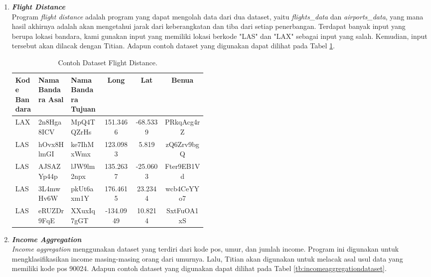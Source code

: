 \begin{enumerate}
      \item \emph{\textbf{Flight Distance}} \\
            Program \emph{flight distance} adalah program yang dapat mengolah data dari dua dataset, yaitu \emph{flights\_data} dan \emph{airports\_data}, yang mana hasil akhirnya adalah akan mengetahui jarak dari keberangkatan dan tiba dari setiap penerbangan. 
            Terdapat banyak input yang berupa lokasi bandara, kami gunakan input yang memiliki lokasi berkode "LAS" dan "LAX" sebagai input yang salah. Kemudian, input tersebut akan dilacak dengan Titian.
            Adapun contoh dataset yang digunakan dapat 
            dilihat pada Tabel \ref{tb:flightdistancedataset}.

            \begin{longtable}{|p{0.12\linewidth}|p{0.17\linewidth}|p{0.17\linewidth}|c|c|c|}
                  \caption{Contoh Dataset Flight Distance.}
                  \label{tb:flightdistancedataset} \\
                  \hline
                  \rowcolor[HTML]{C0C0C0}
                  \raggedright{\textbf{Kode Bandara}} & \raggedright{\textbf{Nama Bandara Asal}} & \raggedright{\textbf{Nama Bandara Tujuan}} & \textbf{Long} & \textbf{Lat} & \textbf{Benua} \\
                  \hline
                  LAX & 2n8Hga8ICV & MpQ4TQZrHs & 151.3466 & -68.5339 & PRkqAcg4rZ \\
                  LAS & hOvx8HlmGI & ke7IhMxWmx & 123.0983 & 5.819 & zQ6Zrv9bgQ \\
                  LAS & AJSAZYp44p & lJW9lm2npx & 135.2637 & -25.0603 & Fter9EB1Vd \\
                  LAS & 3L4mwHv6W & pkUt6axm1Y & 176.4615 & 23.2344 & wcb4CeYYo7 \\
                  LAS & eRUZDr9FqE & XXuxIq7gGT & -134.0949 & 10.8214 & SxtFuOA1xS \\
                  \hline
            \end{longtable}
            
      \item \emph{\textbf{Income Aggregation}} \\
            \emph{Income aggregation} menggunakan dataset yang terdiri dari kode pos, umur, dan jumlah income. Program ini digunakan untuk mengklasifikasikan income masing-masing orang dari umurnya. Lalu, Titian akan digunakan untuk melacak asal usul data yang memiliki kode pos 90024.
            Adapun contoh dataset yang digunakan dapat 
            dilihat pada Tabel \ref{tb:incomeaggregationdataset}.


\end{enumerate}
